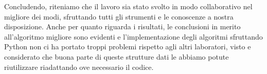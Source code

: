 Concludendo, riteniamo che il lavoro sia stato svolto in modo collaborativo nel migliore dei modi, sfruttando tutti gli strumenti e le conoscenze a nostra disposizione. Anche per quanto riguarda i risultati, le conclusioni in merito all'algoritmo migliore sono evidenti e l'implementazione degli algoritmi sfruttando Python non ci ha portato troppi problemi rispetto agli altri laboratori, visto e considerato che buona parte di queste strutture dati le abbiamo potute riutilizzare riadattando ove necessario il codice. 
